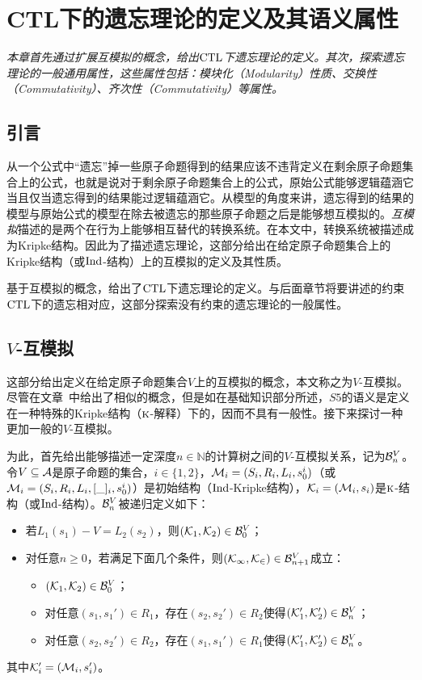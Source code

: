 
\chapter{CTL下的遗忘理论的定义及其语义属性}\label{chapter03}
{\em 本章首先通过扩展互模拟的概念，给出$\textrm{CTL}$下遗忘理论的定义。其次，探索遗忘理论的一般通用属性，这些属性包括：模块化（Modularity）性质、交换性（Commutativity）、齐次性（Commutativity）等属性。}

\section{引言}
从一个公式中“遗忘”掉一些原子命题得到的结果应该不违背定义在剩余原子命题集合上的公式，也就是说对于剩余原子命题集合上的公式，原始公式能够逻辑蕴涵它当且仅当遗忘得到的结果能过逻辑蕴涵它。从模型的角度来讲，遗忘得到的结果的模型与原始公式的模型在除去被遗忘的那些原子命题之后是能够想互模拟的。\emph{互模拟}描述的是两个在行为上能够相互替代的转换系统\cite{Baier:PMC:2008}。在本文中，转换系统被描述成为Kripke结构。因此为了描述遗忘理论，这部分给出在给定原子命题集合上的Kripke结构（或$\textrm{Ind}$-结构）上的互模拟的定义及其性质。

基于互模拟的概念，给出了$\textrm{CTL}$下遗忘理论的定义。与后面章节将要讲述的约束$\textrm{CTL}$下的遗忘相对应，这部分探索没有约束的遗忘理论的一般属性。

\section{$V$-互模拟}

这部分给出定义在给定原子命题集合$V$上的互模拟的概念，本文称之为$V$-互模拟。尽管在文章~\cite{Yan:AIJ:2009}中给出了相似的概念，但是如在基础知识部分所述，$S5$的语义是定义在一种特殊的Kripke结构（$\textsc{k}$-解释）下的，因而不具有一般性。接下来探讨一种更加一般的$V$-互模拟。

为此，首先给出能够描述一定深度$n\in \mathbb{N}$的计算树之间的$V$-互模拟关系，记为${\cal B}_n^V$。令$V\subseteq {\cal A}$是原子命题的集合，$i\in \{1,2\}$，${\cal M}_i=(S_i,R_i,L_i,s_0^i)$（或${\cal M}_i=(S_i,R_i,L_i,[\_]_i,s_0^i)$）是初始结构（$\textrm{Ind}$-Kripke结构），${\cal K}_i=({\cal M}_i, s_i)$是$\textsc{k}$-结构（或$\textrm{Ind}$-结构）。${\cal B}_n^V$被递归定义如下：
\begin{itemize}
	\item 若$L_1(s_1)-V=L_2(s_2)$，则$({\cal K}_1,{\cal K}_2) \in {\cal B}_0^V$；
	\item 对任意$n\ge 0$，若满足下面几个条件，则$({\cal K_1},{\cal K_2})\in {\cal B}_{n+1}^V$成立：
		\begin{itemize}
			\item $({\cal K}_1,{\cal K}_2) \in {\cal B}_0^V$；
			\item 对任意$(s_1,s_1')\in R_1$，存在$(s_2,s_2')\in R_2$使得$({\cal K}_1',{\cal K}_2') \in {\cal B}_n^V$；
			\item 对任意$(s_2,s_2')\in R_2$，存在$(s_1,s_1')\in R_1$使得$({\cal K}_1',{\cal K}_2') \in {\cal B}_n^V$。
		\end{itemize}
\end{itemize}
其中${\cal K}_i'=({\cal M}_i,s_i')$。

